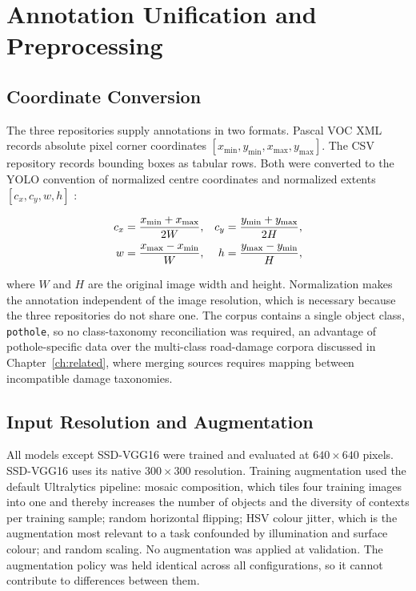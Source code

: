 \documentclass[MScCS]{uccthesis}
\begin{document}
\section{Annotation Unification and Preprocessing}
\label{sec:preprocessing}

\subsection{Coordinate Conversion}

The three repositories supply annotations in two formats. Pascal VOC XML
records absolute pixel corner coordinates
$[x_{\min}, y_{\min}, x_{\max}, y_{\max}]$. The CSV repository records
bounding boxes as tabular rows. Both were converted to the YOLO convention of
normalized centre coordinates and normalized extents
$[c_x, c_y, w, h]$ \parencite{ultralytics2023yolov8}:

\begin{align}
   c_x &= \frac{x_{\min} + x_{\max}}{2W}, &
   c_y &= \frac{y_{\min} + y_{\max}}{2H}, \notag \\
   w   &= \frac{x_{\max} - x_{\min}}{W},  &
   h   &= \frac{y_{\max} - y_{\min}}{H},
   \label{eq:yolo_convert}
\end{align}

where $W$ and $H$ are the original image width and height. Normalization makes
the annotation independent of the image resolution, which is necessary because
the three repositories do not share one. The corpus contains a single object
class, \texttt{pothole}, so no class-taxonomy reconciliation was required, an advantage of pothole-specific data over the multi-class road-damage corpora
discussed in Chapter~\ref{ch:related}, where merging sources requires mapping
between incompatible damage taxonomies.

\subsection{Input Resolution and Augmentation}

All models except SSD-VGG16 were trained and evaluated at $640 \times 640$
pixels. SSD-VGG16 uses its native $300 \times 300$ resolution. Training
augmentation used the default Ultralytics pipeline: mosaic composition, which
tiles four training images into one and thereby increases the number of objects
and the diversity of contexts per training sample; random horizontal flipping;
HSV colour jitter, which is the augmentation most relevant to a task confounded
by illumination and surface colour; and random scaling. No augmentation was
applied at validation. The augmentation policy was held identical across all
configurations, so it cannot contribute to differences between them.
\end{document}
